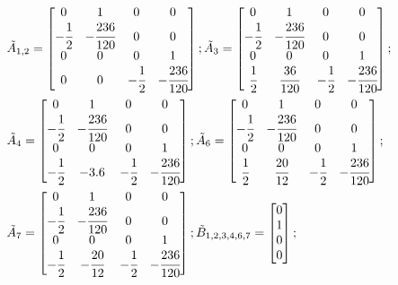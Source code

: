 \begin{align*}
	&\tilde{A}_{1,2} =
	\begin{bmatrix}
		0 & 1 & 0 & 0\\
		- \cfrac{1}{2} & - \cfrac{236}{120} & 0 & 0\\
		0 & 0 & 0 & 1\\
		0 & 0 &- \cfrac{1}{2} & - \cfrac{236}{120}
	\end{bmatrix};
	\tilde{A}_3 =
	\begin{bmatrix}
		0 & 1 & 0 & 0\\
		- \cfrac{1}{2} & - \cfrac{236}{120} & 0 & 0\\
		0 & 0 & 0 & 1\\
		\cfrac{1}{2} & \cfrac{36}{120} &- \cfrac{1}{2} & - \cfrac{236}{120}
	\end{bmatrix};\\
	&\tilde{A}_4 =
	\begin{bmatrix}
		0 & 1 & 0 & 0\\
		- \cfrac{1}{2} & - \cfrac{236}{120} & 0 & 0\\
		0 & 0 & 0 & 1\\
		- \cfrac{1}{2} & - 3.6 &- \cfrac{1}{2} & - \cfrac{236}{120}
	\end{bmatrix};
	\tilde{A}_6 =
	\begin{bmatrix}
		0 & 1 & 0 & 0\\
		- \cfrac{1}{2} & - \cfrac{236}{120} & 0 & 0\\
		0 & 0 & 0 & 1\\
		\cfrac{1}{2} & \cfrac{20}{12} &- \cfrac{1}{2} & - \cfrac{236}{120}
	\end{bmatrix};\\
	&\tilde{A}_7 =
	\begin{bmatrix}
		0 & 1 & 0 & 0\\
		- \cfrac{1}{2} & - \cfrac{236}{120} & 0 & 0\\
		0 & 0 & 0 & 1\\
		- \cfrac{1}{2} & - \cfrac{20}{12} &- \cfrac{1}{2} & - \cfrac{236}{120}
	\end{bmatrix};
	\tilde{B}_{1,2,3,4,6,7} =
	\begin{bmatrix}
		0\\
		1\\
		0\\
		0
	\end{bmatrix};
\end{align*}

